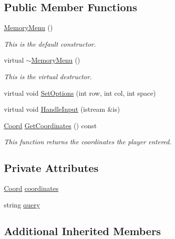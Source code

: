 \subsection*{Public Member Functions}
\begin{DoxyCompactItemize}
\item 
\hyperlink{classMemoryMenu_ae86d93eea6621532fba704fed5c9ec33}{Memory\-Menu} ()
\begin{DoxyCompactList}\small\item\em This is the default constructor. \end{DoxyCompactList}\item 
virtual \hyperlink{classMemoryMenu_a4f364ab881bd477e664ef77ceea105fe}{$\sim$\-Memory\-Menu} ()
\begin{DoxyCompactList}\small\item\em This is the virtual destructor. \end{DoxyCompactList}\item 
virtual void \hyperlink{classMemoryMenu_acde088f671d95d13f50b27ac345d2968}{Set\-Options} (int row, int col, int space)
\item 
virtual void \hyperlink{classMemoryMenu_afbe9762ac2e61c6eba82df18aa9aea73}{Handle\-Input} (istream \&is)
\item 
\hyperlink{structMemoryMenu_1_1Coord}{Coord} \hyperlink{classMemoryMenu_afc417793ed520f9382f106d05cf26286}{Get\-Coordinates} () const 
\begin{DoxyCompactList}\small\item\em This function returns the coordinates the player entered. \end{DoxyCompactList}\end{DoxyCompactItemize}
\subsection*{Private Attributes}
\begin{DoxyCompactItemize}
\item 
\hyperlink{structMemoryMenu_1_1Coord}{Coord} \hyperlink{classMemoryMenu_aa29295841088ab4c667a88ae91a0dd45}{coordinates}
\item 
string \hyperlink{classMemoryMenu_af0e3a6658007f4782d181f19d39719f4}{query}
\end{DoxyCompactItemize}
\subsection*{Additional Inherited Members}


